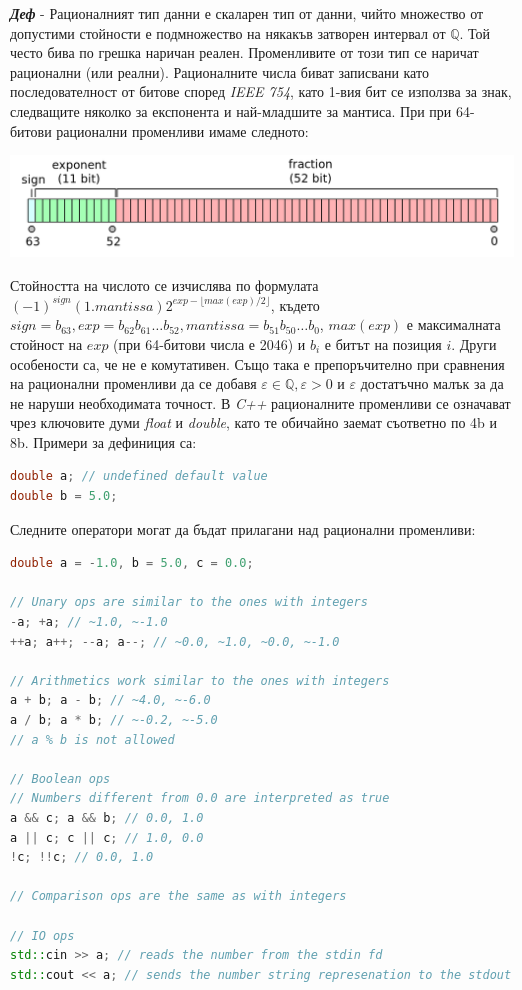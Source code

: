 \documentclass[fleqn,12pt]{article}
\begin{document}
\noindent \textit{\textbf{Деф}} - Рационалният тип данни е скаларен тип от данни, чийто множество от допустими стойности е подмножество на някакъв затворен интервал от $\mathbb{Q}$.
Той често бива по грешка наричан реален. Променливите от този тип се наричат рационални (или реални).
Рационалните числа биват записвани като последователност от битове според \textit{IEEE 754}, като 1-вия бит се използва за знак, следващите няколко за експонента и най-младшите за мантиса.
При при 64-битови рационални променливи имаме следното:

\includegraphics[width=\textwidth]{floating_point_num.png}

Стойността на числото се изчислява по формулата $(-1)^{sign} (1.mantissa) 2^{exp - \lfloor max(exp)/2 \rfloor}$, където $sign = b_{63}, exp = b_{62}b_{61} \dots b_{52}, mantissa = b_{51}b_{50} \dots b_{0}$, $max(exp)$ е максималната стойност на $exp$ (при 64-битови числа е 2046) и $b_i$ е битът на позиция $i$.
\bigbreak
Други особености са, че не е комутативен. Също така е препоръчително при сравнения на рационални променливи да се добавя $\varepsilon \in \mathbb{Q}, \varepsilon > 0$ и $\varepsilon$ достатъчно малък за да не наруши необходимата точност.
\bigbreak
В \textit{C++} рационалните променливи се означават чрез ключовите думи \textit{float} и \textit{double}, като те обичайно заемат съответно по 4b и 8b. Примери за дефиниция са:

\begin{lstlisting}[language=C++, caption=Real numbers]
double a; // undefined default value
double b = 5.0;
\end{lstlisting}

Следните оператори могат да бъдат прилагани над рационални променливи:

\begin{lstlisting}[language=C++, caption=Real number operations]
double a = -1.0, b = 5.0, c = 0.0;

// Unary ops are similar to the ones with integers
-a; +a; // ~1.0, ~-1.0
++a; a++; --a; a--; // ~0.0, ~1.0, ~0.0, ~-1.0

// Arithmetics work similar to the ones with integers
a + b; a - b; // ~4.0, ~-6.0
a / b; a * b; // ~-0.2, ~-5.0
// a % b is not allowed

// Boolean ops
// Numbers different from 0.0 are interpreted as true
a && c; a && b; // 0.0, 1.0
a || c; c || c; // 1.0, 0.0
!c; !!c; // 0.0, 1.0

// Comparison ops are the same as with integers

// IO ops
std::cin >> a; // reads the number from the stdin fd
std::cout << a; // sends the number string represenation to the stdout fd
\end{lstlisting}
\end{document}
